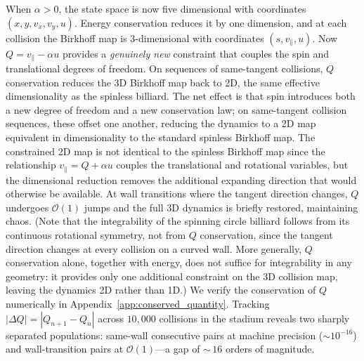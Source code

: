 \documentclass[aps,prd,twocolumn,superscriptaddress,nofootinbib,floatfix]{revtex4-2}
\begin{document}
\noindent
When $\alpha > 0$, the state space is now five dimensional with coordinates $(x, y, v_x, v_y, u)$. Energy conservation reduces it by one dimension, and at each collision the Birkhoff map is 3-dimensional with coordinates $(s, v_\parallel, u)$. Now $Q = v_\parallel - \alpha u$ provides a \emph{genuinely new} constraint that couples the spin and translational degrees of freedom. On sequences of same-tangent collisions, $Q$ conservation reduces the 3D Birkhoff map back to 2D, the same effective dimensionality as the spinless billiard. The net effect is that spin introduces both a new degree of freedom and a new conservation law; on same-tangent collision sequences, these offset one another, reducing the dynamics to a 2D map equivalent in dimensionality to the standard spinless Birkhoff map. The constrained 2D map is not identical to the spinless Birkhoff map since the relationship $v_\parallel = Q + \alpha u$ couples the translational and rotational variables, but the dimensional reduction removes the additional expanding direction that would otherwise be available. At wall transitions where the tangent direction changes, $Q$ undergoes $\mathcal{O}(1)$ jumps and the full 3D dynamics is briefly restored, maintaining chaos. (Note that the integrability of the spinning circle billiard follows from its continuous rotational symmetry, not from $Q$ conservation, since the tangent direction changes at every collision on a curved wall. More generally, $Q$ conservation alone, together with energy, does not suffice for integrability in any geometry: it provides only one additional constraint on the 3D collision map, leaving the dynamics 2D rather than 1D.) We verify the conservation of $Q$ numerically in Appendix~\ref{app:conserved_quantity}. Tracking $|\Delta Q| = |Q_{n+1} - Q_n|$ across $10{,}000$ collisions in the stadium reveals two sharply separated populations: same-wall consecutive pairs at machine precision ($\sim 10^{-16}$) and wall-transition pairs at $\mathcal{O}(1)$---a gap of ${\sim}\,16$ orders of magnitude.\\
\end{document}
